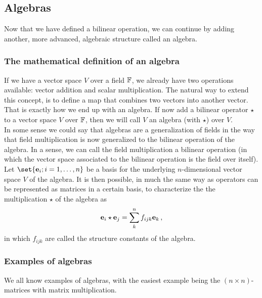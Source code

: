 \subsection{Algebras}
    Now that we have defined a bilinear operation, we can continue by adding another, more advanced, algebraic structure called an algebra.

    \subsubsection{The mathematical definition of an algebra}
        If we have a vector space $V$ over a field $\mathbb{F}$, we already have two operations available: vector addition and scalar multiplication. The natural way to extend this concept, is to define a map that combines two vectors into another vector. That is exactly how we end up with an algebra. If now add a bilinear operator $\star$ to a vector space $V$ over $\mathbb{F}$, then we will call $V$ an algebra (with $\star$) over $V$. \\

        In some sense we could say that algebras are a generalization of fields in the way that field multiplication is now generalized to the bilinear operation of the algebra. In a sense, we can call the field multiplication a bilinear operation (in which the vector space associated to the bilinear operation is the field over itself). \\

        Let $\set{\vb{e}_i ; i=1,\dots,n}$ be a basis for the underlying $n$-dimensional vector space $V$ of the algebra. It is then possible, in much the same way as operators can be represented as matrices in a certain basis, to characterize the the multiplication $\star$ of the algebra as
        \begin{equation}
            \vb{e}_i \star \vb{e}_j = \sum_k^n f_{ijk} \vb{e}_k \thinspace ,
        \end{equation}
        in which $f_{ijk}$ are called the structure constants of the algebra. \\

    \subsubsection{Examples of algebras}
        We all know examples of algebras, with the easiest example being the $(n \times n)$-matrices with matrix multiplication. \\

